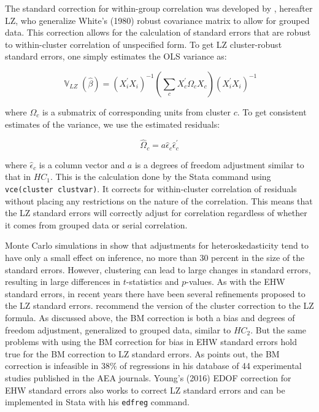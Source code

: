 \documentclass[11pt]{article}
\DeclareMathOperator{\V}{\mathbb{V}}
\begin{document}
The standard correction for within-group correlation was developed by \cite{liang_longitudinal_1986}, hereafter LZ, who generalize White’s (1980) robust covariance matrix to allow for grouped data. This correction allows for the calculation of standard errors that are robust to within-cluster correlation of unspecified form. To get LZ cluster-robust standard errors, one simply estimates the OLS variance as:

\begin{equation}
    \V_{LZ} \left( \hat{\beta} \right) = \left( X_{i}^{'} X_{i} \right)^{-1} \left( \sum_{c} X_{c}^{'} \Omega_{c} X_{c} \right) \left( X_{i}^{'} X_{i} \right)^{-1}
\end{equation}

\noindent where $\Omega_c$ is a submatrix of corresponding units from cluster $c$. To get consistent estimates of the variance, we use the estimated residuals:

\begin{equation}
    \hat{\Omega}_{c} = a \hat{\epsilon}_{c} \hat{\epsilon}^{'}_{c}
\end{equation}

\noindent where $\hat{\epsilon}_c$ is a column vector and $a$ is a degrees of freedom adjustment similar to that in $HC_1$. This is the calculation done by the Stata command using \texttt{vce(cluster clustvar)}. It corrects for within-cluster correlation of residuals without placing any restrictions on the nature of the correlation. This means that the LZ standard errors will correctly adjust for correlation regardless of whether it comes from grouped data or serial correlation.

Monte Carlo simulations in \cite{angrist_mostly_2009} show that adjustments for heteroskedasticity tend to have only a small effect on inference, no more than 30 percent in the size of the standard errors. However, clustering can lead to large changes in standard errors, resulting in large differences in $t$-statistics and $p$-values. As with the EHW standard errors, in recent years there have been several refinements proposed to the LZ standard errors. \cite{imbens_robust_2016} recommend the \cite{bell_bias_2002} version of the cluster correction to the LZ formula. As discussed above, the BM correction is both a bias and degrees of freedom adjustment, generalized to grouped data, similar to $HC_2$. But the same problems with using the BM correction for bias in EHW standard errors hold true for the BM correction to LZ standard errors. As \cite{young_improved_2016} points out, the BM correction is infeasible in $38\%$ of regressions in his database of 44 experimental studies published in the AEA journals. Young’s (2016) EDOF correction for EHW standard errors also works to correct LZ standard errors and can be implemented in Stata with his \texttt{edfreg} command.
\end{document}
